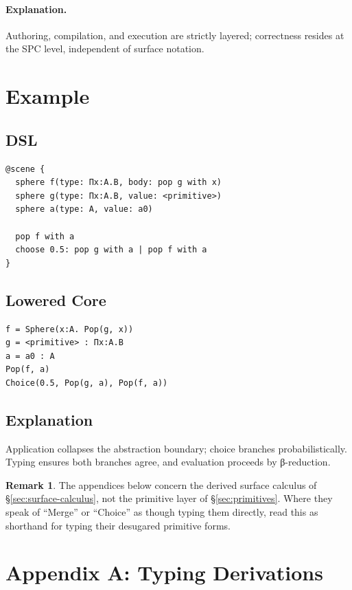 \documentclass[12pt]{article}
\theoremstyle{definition}
\newtheorem{remark}{Remark}
\begin{document}
\paragraph{Explanation.}
Authoring, compilation, and execution are strictly layered; correctness resides at the SPC level, independent of surface notation.

\section{Example}
\subsection{DSL}
\begin{verbatim}
@scene {
  sphere f(type: Πx:A.B, body: pop g with x)
  sphere g(type: Πx:A.B, value: <primitive>)
  sphere a(type: A, value: a0)

  pop f with a
  choose 0.5: pop g with a | pop f with a
}
\end{verbatim}

\subsection{Lowered Core}
\begin{verbatim}
f = Sphere(x:A. Pop(g, x))
g = <primitive> : Πx:A.B
a = a0 : A
Pop(f, a)
Choice(0.5, Pop(g, a), Pop(f, a))
\end{verbatim}

\subsection{Explanation}
Application collapses the abstraction boundary; choice branches probabilistically. 
Typing ensures both branches agree, and evaluation proceeds by β-reduction.

\appendix

\begin{remark}
The appendices below concern the derived surface calculus of \S\ref{sec:surface-calculus}, not the primitive layer of \S\ref{sec:primitives}. Where they speak of ``Merge'' or ``Choice'' as though typing them directly, read this as shorthand for typing their desugared primitive forms.
\end{remark}

\section{Appendix A: Typing Derivations}
\end{document}
